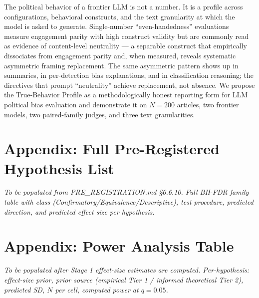 \documentclass{article}
\begin{document}
The political behavior of a frontier LLM is not a number. It is a profile across configurations, behavioral constructs, and the text granularity at which the model is asked to generate. Single-number ``even-handedness'' evaluations measure engagement parity with high construct validity but are commonly read as evidence of content-level neutrality — a separable construct that empirically dissociates from engagement parity and, when measured, reveals systematic asymmetric framing replacement. The same asymmetric pattern shows up in summaries, in per-detection bias explanations, and in classification reasoning; the directives that prompt ``neutrality'' achieve replacement, not absence. We propose the True-Behavior Profile as a methodologically honest reporting form for LLM political bias evaluation and demonstrate it on $N=200$ articles, two frontier models, two paired-family judges, and three text granularities.




\appendix

\section{Appendix: Full Pre-Registered Hypothesis List}
\label{app:hypotheses}
\textit{To be populated from PRE\_REGISTRATION.md \S6.6.10. Full BH-FDR family table with class (Confirmatory/Equivalence/Descriptive), test procedure, predicted direction, and predicted effect size per hypothesis.}

\section{Appendix: Power Analysis Table}
\label{app:power}
\textit{To be populated after Stage 1 effect-size estimates are computed. Per-hypothesis: effect-size prior, prior source (empirical Tier 1 / informed theoretical Tier 2), predicted SD, $N$ per cell, computed power at $q = 0.05$.}
\end{document}
